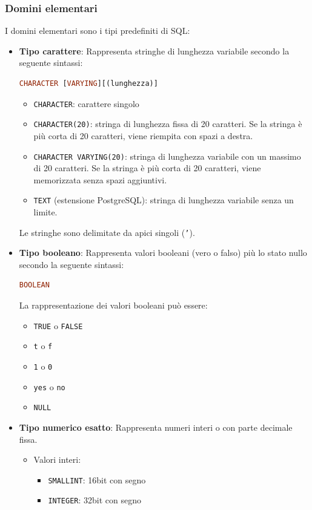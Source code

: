 \documentclass[a4paper]{article}
\begin{document}
\subsubsection{Domini elementari}
I domini elementari sono i tipi predefiniti di SQL:
\begin{itemize}
  \item \textbf{Tipo carattere}:
    Rappresenta stringhe di lunghezza variabile secondo la seguente sintassi:
\begin{lstlisting}[language=SQL, numbers=none]
CHARACTER [VARYING][(lunghezza)]
\end{lstlisting}
    \begin{itemize}
      \item \texttt{CHARACTER}: carattere singolo

      \item \texttt{CHARACTER(20)}: stringa di lunghezza fissa di 20 caratteri.
        Se la stringa è più corta di 20 caratteri, viene riempita con spazi a destra.

      \item \texttt{CHARACTER VARYING(20)}: stringa di lunghezza variabile con un massimo
        di 20 caratteri. Se la stringa è più corta di 20 caratteri, viene memorizzata
        senza spazi aggiuntivi.

      \item \texttt{TEXT} (estensione PostgreSQL): stringa di lunghezza variabile senza
        un limite.
    \end{itemize}
    Le stringhe sono delimitate da apici singoli (\texttt{'}).

  \item \textbf{Tipo booleano}:
    Rappresenta valori booleani (vero o falso) più lo stato nullo secondo la seguente
    sintassi:
\begin{lstlisting}[language=SQL, numbers=none]
BOOLEAN
\end{lstlisting}
    La rappresentazione dei valori booleani può essere:
    \begin{itemize}
      \item \texttt{TRUE} o \texttt{FALSE}
      \item \texttt{t} o \texttt{f}
      \item \texttt{1} o \texttt{0}
      \item \texttt{yes} o \texttt{no}
      \item \texttt{NULL}
    \end{itemize}

  \item \textbf{Tipo numerico esatto}:
    Rappresenta numeri interi o con parte decimale fissa.
    \begin{itemize}
      \item Valori interi:
        \begin{itemize}
          \item \texttt{SMALLINT}: 16bit con segno
          \item \texttt{INTEGER}: 32bit con segno
        \end{itemize}


\end{itemize}
\end{itemize}
\end{document}
